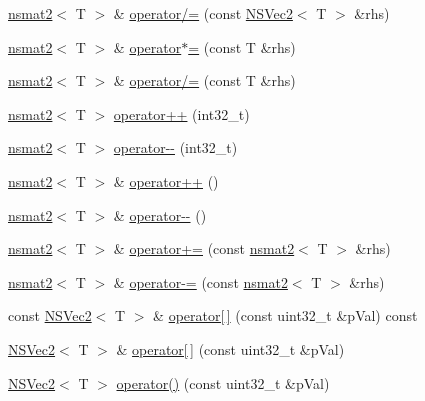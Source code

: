 \begin{DoxyCompactItemize}
\item 
\hyperlink{structnsmat2}{nsmat2}$<$ T $>$ \& \hyperlink{structnsmat2_a33086eefd67b1a128320a8c23b7b5b1d}{operator/=} (const \hyperlink{structNSVec2}{N\-S\-Vec2}$<$ T $>$ \&rhs)
\item 
\hyperlink{structnsmat2}{nsmat2}$<$ T $>$ \& \hyperlink{structnsmat2_a1a136c4412213b6cce33a860003d076f}{operator$\ast$=} (const T \&rhs)
\item 
\hyperlink{structnsmat2}{nsmat2}$<$ T $>$ \& \hyperlink{structnsmat2_a3ee4b9a3eda0b45fd3153ab406afa3a6}{operator/=} (const T \&rhs)
\item 
\hyperlink{structnsmat2}{nsmat2}$<$ T $>$ \hyperlink{structnsmat2_a1af4ba266094ecf607ba4d21437b7408}{operator++} (int32\-\_\-t)
\item 
\hyperlink{structnsmat2}{nsmat2}$<$ T $>$ \hyperlink{structnsmat2_a8c242b293708ea02a022352a2ae1f361}{operator-\/-\/} (int32\-\_\-t)
\item 
\hyperlink{structnsmat2}{nsmat2}$<$ T $>$ \& \hyperlink{structnsmat2_a7bce45f0fe89e994a5a296c7652b799d}{operator++} ()
\item 
\hyperlink{structnsmat2}{nsmat2}$<$ T $>$ \& \hyperlink{structnsmat2_a5823185a034e93f461df7a45d107f2ac}{operator-\/-\/} ()
\item 
\hyperlink{structnsmat2}{nsmat2}$<$ T $>$ \& \hyperlink{structnsmat2_acae588f2fc4a4d61a8d13dffe7d2a4a7}{operator+=} (const \hyperlink{structnsmat2}{nsmat2}$<$ T $>$ \&rhs)
\item 
\hyperlink{structnsmat2}{nsmat2}$<$ T $>$ \& \hyperlink{structnsmat2_a999d210b64ffcf61bb62ad8105684a0b}{operator-\/=} (const \hyperlink{structnsmat2}{nsmat2}$<$ T $>$ \&rhs)
\item 
const \hyperlink{structNSVec2}{N\-S\-Vec2}$<$ T $>$ \& \hyperlink{structnsmat2_ac1cd9357b9903b8a2c5314ac2e0c3226}{operator\mbox{[}$\,$\mbox{]}} (const uint32\-\_\-t \&p\-Val) const 
\item 
\hyperlink{structNSVec2}{N\-S\-Vec2}$<$ T $>$ \& \hyperlink{structnsmat2_a578aba4ca0ef459f67a6af7db59a3462}{operator\mbox{[}$\,$\mbox{]}} (const uint32\-\_\-t \&p\-Val)
\item 
\hyperlink{structNSVec2}{N\-S\-Vec2}$<$ T $>$ \hyperlink{structnsmat2_a23876c6602b91eaf0d044d7aca198570}{operator()} (const uint32\-\_\-t \&p\-Val)
\end{DoxyCompactItemize}


